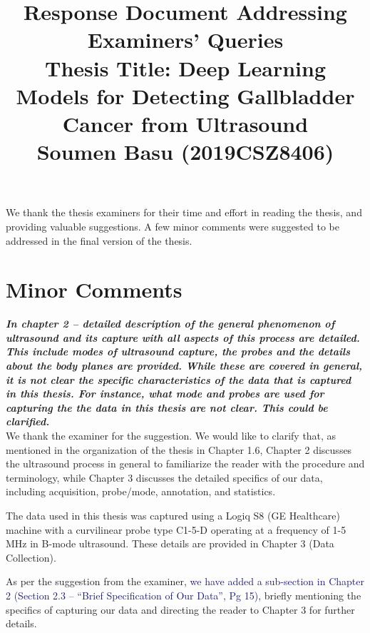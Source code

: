 \documentclass[11pt,times]{article}
\newcommand{\rev}[1]{\textcolor{MidnightBlue}{#1}}
\newcommand{\myfirstpara}[1]{\noindent \textbf{\textit{#1}}}
\newcommand{\mypara}[1]{\vspace{0.75em} \myfirstpara{#1}\\}
\begin{document}
\title{\Large Response Document Addressing Examiners' Queries \\
{ Thesis Title: Deep Learning Models for Detecting Gallbladder Cancer from Ultrasound \\ Soumen Basu (2019CSZ8406)}}  %
\date{}

\maketitle
\thispagestyle{empty}
\appendix
{\selectfont

\noindent We thank the thesis examiners for their time and effort in reading the thesis, and providing valuable suggestions. A few minor comments were suggested to be addressed in the final version of the thesis. %

\section*{Minor Comments}

\mypara{In chapter 2 --  detailed description of the general phenomenon of ultrasound and its capture with all aspects of this process are detailed. This include modes of ultrasound capture, the probes and the details about the body planes are provided. While these are covered in general, it is not clear the specific characteristics of the data that is captured in this thesis. For instance, what mode and probes are used for capturing the the data in this thesis are not clear. This could be clarified.}
%
We thank the examiner for the suggestion. We would like to clarify that, as mentioned in the organization of the thesis in Chapter 1.6, Chapter 2 discusses the ultrasound process in general to familiarize the reader with the procedure and terminology, while Chapter 3 discusses the detailed specifics of our data, including acquisition, probe/mode, annotation, and statistics.

\noindent The data used in this thesis was captured using a Logiq S8 (GE Healthcare) machine with a curvilinear probe type C1-5-D operating at a frequency of 1-5 MHz in B-mode ultrasound. These details are provided in Chapter 3 (Data Collection).

As per the suggestion from the examiner, \rev{we have added a sub-section in Chapter 2 (Section 2.3 -- ``Brief Specification of Our Data'', Pg 15)}, briefly mentioning the specifics of capturing our data and directing the reader to Chapter 3 for further details. %

}
\end{document}
